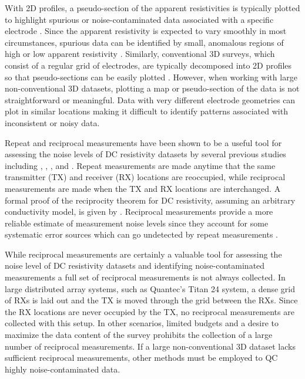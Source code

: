 \documentclass[final,authoryear,5p,times,twocolumn]{elsarticle}
\begin{document}
With 2D profiles, a pseudo-section of the apparent resistivities is typically plotted to highlight spurious or noise-contaminated data associated with a specific electrode \citep{Edwards1977,Deceuster2013}. Since the apparent resistivity is expected to vary smoothly in most circumstances, spurious data can be identified by small, anomalous regions of high or low apparent resistivity \citep{Loke2000}. Similarly, conventional 3D surveys, which consist of a regular grid of electrodes, are typically decomposed into 2D profiles so that pseudo-sections can be easily plotted \citep{Auken2006}. However, when working with large non-conventional 3D datasets, plotting a map or pseudo-section of the data is not straightforward or meaningful. Data with very different electrode geometries can plot in similar locations making it difficult to identify patterns associated with inconsistent or noisy data. 

Repeat and reciprocal measurements have been shown to be a useful tool for assessing the noise levels of DC resistivity datasets by several previous studies including \cite{LaBrecque1996}, \cite{Slater2000}, \cite{Zhou2003}, \cite{LaBrecque2008} and \cite{Wilkinson2012}. Repeat measurements are made anytime that the same transmitter (TX) and receiver (RX) locations are reoccupied, while reciprocal measurements are made when the TX and RX locations are interchanged. A formal proof of the reciprocity theorem for DC resistivity, assuming an arbitrary conductivity model, is given by \cite{Parasnis1988}. Reciprocal measurements provide a more reliable estimate of measurement noise levels since they account for some systematic error sources which can go undetected by repeat measurements \citep{LaBrecque1996}.  

While reciprocal measurements are certainly a valuable tool for assessing the noise level of DC resistivity datasets and identifying noise-contaminated measurements a full set of reciprocal measurements is not always collected. In large distributed array systems, such as Quantec's Titan 24 system, a dense grid of RXs is laid out and the TX is moved through the grid between the RXs. Since the RX locations are never occupied by the TX, no reciprocal measurements are collected with this setup. In other scenarios, limited budgets and a desire to maximize the data content of the survey prohibits the collection of a large number of reciprocal measurements. If a large non-conventional 3D dataset lacks sufficient reciprocal measurements, other methods must be employed to QC highly noise-contaminated data.
\end{document}
